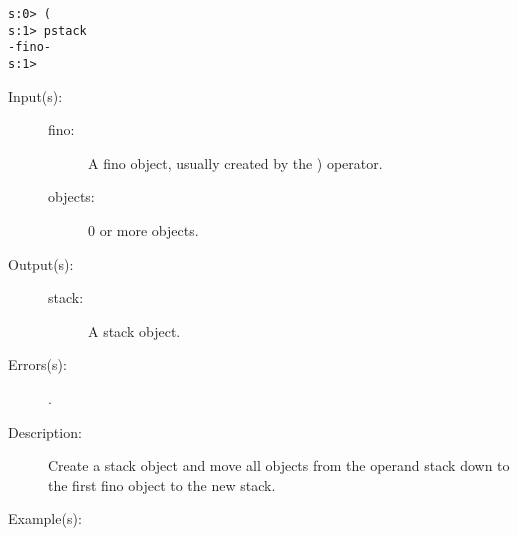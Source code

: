\begin{description}
\begin{description}
\begin{verbatim}
s:0> (
s:1> pstack
-fino-
s:1>
		\end{verbatim}
	\end{description}
\label{systemdict:sym_rp}
\index{\onyxop{}{)}{}}
\item[{\onyxop{fino objects}{)}{stack}}: ]
	\begin{description}\item[]
	\item[Input(s): ]
		\begin{description}\item[]
		\item[fino: ]
			A fino object, usually created by the ) operator.
		\item[objects: ]
			0 or more objects.
		\end{description}
	\item[Output(s): ]
		\begin{description}\item[]
		\item[stack: ]
			A stack object.
		\end{description}
	\item[Errors(s): ]
		\begin{description}\item[]
		\item[.]
		\end{description}
	\item[Description: ]
		Create a stack object and move all objects from the operand
		stack down to the first fino object to the new stack.
	\item[Example(s): ]\begin{verbatim}


\end{verbatim}
\end{description}
\end{description}

